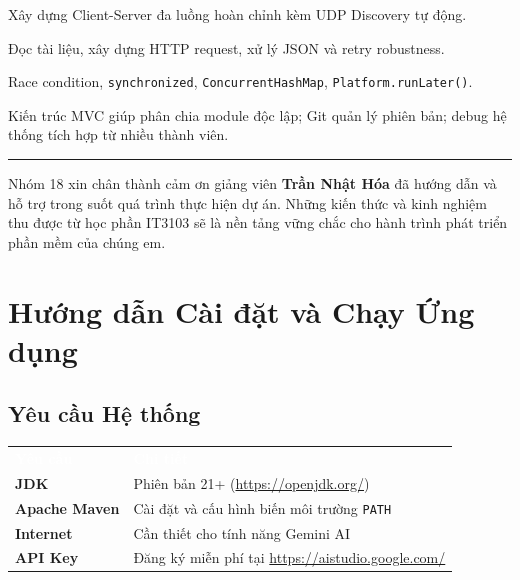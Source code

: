 \documentclass[12pt, a4paper, oneside]{report}
\newcommand{\code}[1]{\texttt{\color{hustblue!80!black}#1}}
\newcommand{\rA}{\rowcolor{rowA}}
\newcommand{\rB}{\rowcolor{rowB}}
\begin{document}
\begin{tcolorbox}[keystyle, title={Kỹ năng nghề nghiệp thu được}]
\begin{description}[leftmargin=0pt, itemsep=5pt]
  \item[\textcolor{hustblue}{Lập trình mạng:}]
    Xây dựng Client-Server đa luồng hoàn chỉnh kèm UDP Discovery tự động.
  \item[\textcolor{hustblue}{Tích hợp API:}]
    Đọc tài liệu, xây dựng HTTP request, xử lý JSON và retry robustness.
  \item[\textcolor{hustblue}{Đa luồng:}]
    Race condition, \code{synchronized}, \code{ConcurrentHashMap},
    \code{Platform.runLater()}.
  \item[\textcolor{hustblue}{Làm việc nhóm:}]
    Kiến trúc MVC giúp phân chia module độc lập; Git quản lý phiên bản;
    debug hệ thống tích hợp từ nhiều thành viên.
\end{description}
\end{tcolorbox}

\bigskip\bigskip
\begin{center}
  \textcolor{hustblue!40}{\rule{0.4\linewidth}{0.4pt}}
\end{center}

\bigskip
\noindent Nhóm 18 xin chân thành cảm ơn giảng viên \textbf{Trần Nhật Hóa}
đã hướng dẫn và hỗ trợ trong suốt quá trình thực hiện dự án. Những kiến thức
và kinh nghiệm thu được từ học phần IT3103 sẽ là nền tảng vững chắc cho hành
trình phát triển phần mềm của chúng em.

\appendix
\chapter{Hướng dẫn Cài đặt và Chạy Ứng dụng}

\section{Yêu cầu Hệ thống}

\begin{table}[H]
  \centering
  \begin{tabularx}{\linewidth}{>{\bfseries}l X}
    \rowcolor{headerrow}
    \textcolor{white}{\textbf{Yêu cầu}} & \textcolor{white}{\textbf{Chi tiết}} \\
    \rA JDK         & Phiên bản 21+ (\url{https://openjdk.org/}) \\
    \rB Apache Maven & Cài đặt và cấu hình biến môi trường \code{PATH} \\
    \rA Internet    & Cần thiết cho tính năng Gemini AI \\
    \rB API Key     & Đăng ký miễn phí tại \url{https://aistudio.google.com/} \\
  \end{tabularx}
\end{table}
\end{document}
